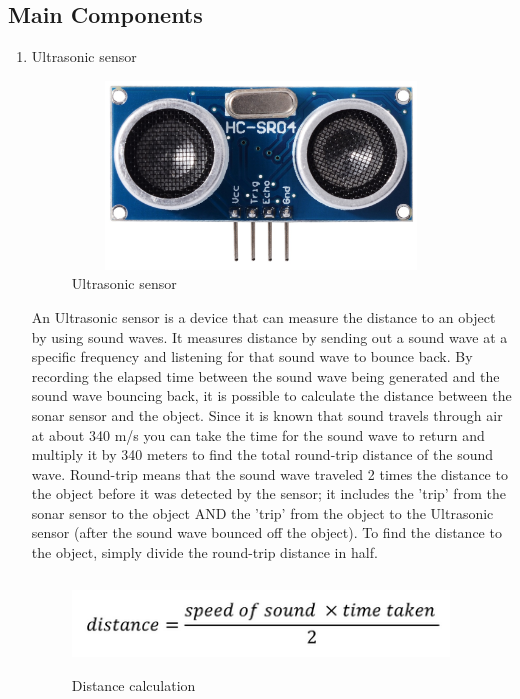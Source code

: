 \subsection{Main Components}
	\begin{enumerate}
		\item Ultrasonic sensor
			\begin{figure}[H]
				\centering
				\includegraphics[width=10cm,height=5cm]{figures/ultra}
				\caption{Ultrasonic sensor}
				\label{Fig:ultrasonic}
			\end{figure}
		An Ultrasonic sensor is a device that can measure the distance to an object by using sound waves. 
		It measures distance by sending out a sound wave at a specific frequency and listening for that sound wave to bounce back. 
		By recording the elapsed time between the sound wave being generated and the sound wave bouncing back, it is possible to calculate the distance between the sonar sensor and the object.
		Since it is known that sound travels through air at about 340 m/s you can take the time for the sound wave to return and multiply it by 340 meters to find the total round-trip distance of the sound wave. 
		Round-trip means that the sound wave traveled 2 times the distance to the object before it was detected by the sensor; it includes the 'trip' from the sonar sensor to the object AND the 'trip' from the object to the Ultrasonic sensor (after the sound wave bounced off the object).
		To find the distance to the object, simply divide the round-trip distance in half.
		\vspace{0mm}
		\begin{figure}[H]
			\centering
			\includegraphics[width=10cm,height=2.5cm]{figures/ultra2}
			\caption{Distance calculation}
			\label{Fig:Distance calculation}

\end{figure}
\end{enumerate}
